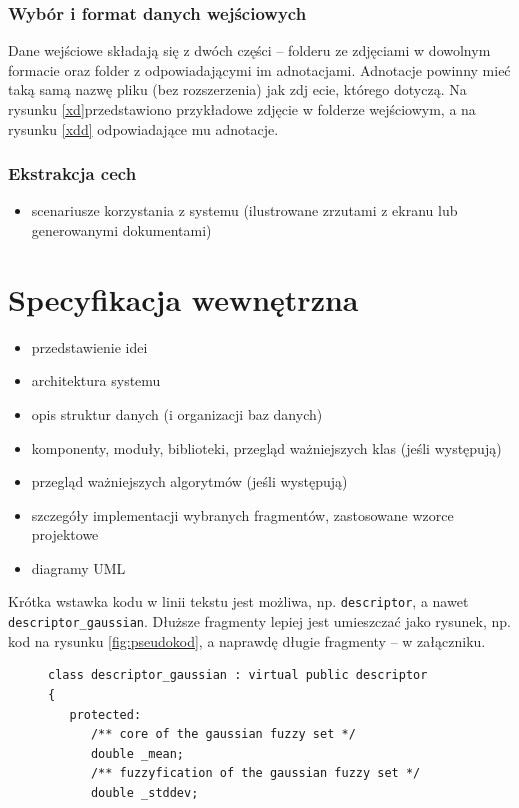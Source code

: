 \documentclass[a4paper,twoside,12pt]{book}
\begin{document}
{\subsection{Wybór i format danych wejściowych}
{Dane wejściowe składają się z dwóch części – folderu ze zdjęciami w dowolnym formacie oraz folder z odpowiadającymi im adnotacjami. Adnotacje powinny mieć taką samą nazwę pliku (bez rozszerzenia) jak zdj ecie, którego dotyczą.
Na rysunku \ref{xd}przedstawiono przykładowe zdjęcie w folderze wejściowym, a na rysunku \ref{xdd} odpowiadające mu adnotacje.}
\subsection{Ekstrakcja cech}

\begin{itemize}
\item  scenariusze korzystania z systemu (ilustrowane zrzutami z ekranu lub generowanymi dokumentami)

\end{itemize}

 

\chapter{Specyfikacja wewnętrzna}


 
\begin{itemize}
\item przedstawienie idei
\item architektura systemu
\item opis struktur danych (i organizacji baz danych)
\item komponenty, moduły, biblioteki, przegląd ważniejszych klas (jeśli występują)
\item przegląd ważniejszych algorytmów (jeśli występują)
\item szczegóły implementacji wybranych fragmentów, zastosowane wzorce projektowe
\item diagramy UML
\end{itemize}



Krótka wstawka kodu w linii tekstu jest możliwa, np. \lstinline|descriptor|, a nawet \lstinline|descriptor_gaussian|. 
Dłuższe fragmenty lepiej jest umieszczać jako rysunek, np. kod na rysunku \ref{fig:pseudokod}, a naprawdę długie fragmenty – w załączniku.

\begin{figure}
\centering
\begin{lstlisting}
class descriptor_gaussian : virtual public descriptor
{
   protected:
      /** core of the gaussian fuzzy set */
      double _mean;
      /** fuzzyfication of the gaussian fuzzy set */
      double _stddev;
      

\end{lstlisting}
\end{figure}}
\end{document}
